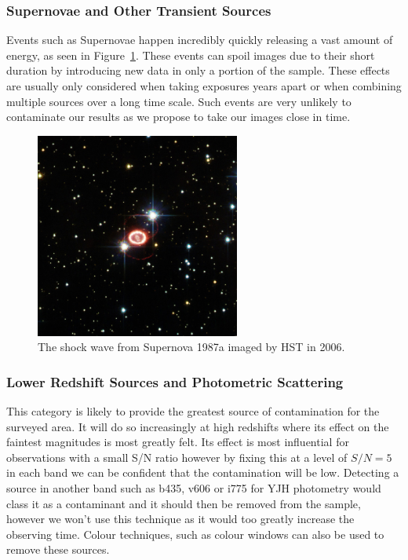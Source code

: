 		    \subsubsection*{Supernovae and Other Transient Sources} %
		    \label{sub:supernovae_and_other_transient_sources}
		        Events such as Supernovae happen incredibly quickly releasing a vast amount of energy, as seen in Figure~\ref{fig:SNe_1987a}. These events can spoil images due to their short duration by introducing new data in only a portion of the sample. These effects are usually only considered when taking exposures years apart or when combining multiple sources over a long time scale. Such events are very unlikely to contaminate our results as we propose to take our images close in time.
		        \begin{figure}[htbp]
		            \centering
		            \includegraphics[width=0.6\textwidth]{../Images/SNe_1987a.jpg}
		            \caption{The shock wave from Supernova 1987a imaged by HST in 2006.\label{fig:SNe_1987a}}
		        \end{figure}

		    \subsubsection*{Lower Redshift Sources and Photometric Scattering} %
		    \label{sub:lower_redshift_sources_and_photometric_scattering}
		        This category is likely to provide the greatest source of contamination for the surveyed area. It will do so increasingly at high redshifts where its effect on the faintest magnitudes is most greatly felt. Its effect is most influential for observations with a small S/N ratio however by fixing this at a level of $S/N = 5$ in each band we can be confident that the contamination will be low. Detecting a source in another band such as b435, v606 or i775 for YJH photometry would class it as a contaminant and it should then be removed from the sample, however we won't use this technique as it would too greatly increase the observing time. Colour techniques, such as colour windows can also be used to remove these sources.

